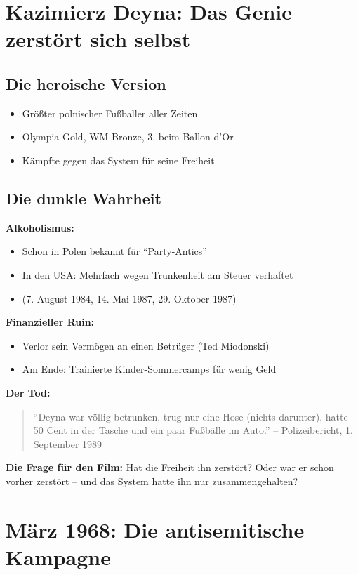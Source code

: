 \documentclass[11pt,a4paper]{book}
\begin{document}
\section{Kazimierz Deyna: Das Genie zerstört sich selbst}

\subsection{Die heroische Version}

\begin{itemize}
    \item Größter polnischer Fußballer aller Zeiten
    \item Olympia-Gold, WM-Bronze, 3. beim Ballon d'Or
    \item Kämpfte gegen das System für seine Freiheit
\end{itemize}

\subsection{Die dunkle Wahrheit}

\textbf{Alkoholismus:}
\begin{itemize}
    \item Schon in Polen bekannt für ``Party-Antics''
    \item In den USA: Mehrfach wegen Trunkenheit am Steuer verhaftet
    \item (7. August 1984, 14. Mai 1987, 29. Oktober 1987)
\end{itemize}

\textbf{Finanzieller Ruin:}
\begin{itemize}
    \item Verlor sein Vermögen an einen Betrüger (Ted Miodonski)
    \item Am Ende: Trainierte Kinder-Sommercamps für wenig Geld
\end{itemize}

\textbf{Der Tod:}
\begin{quote}
``Deyna war völlig betrunken, trug nur eine Hose (nichts darunter), hatte 50 Cent in der Tasche und ein paar Fußbälle im Auto.'' -- Polizeibericht, 1. September 1989
\end{quote}

\textbf{Die Frage für den Film:} Hat die Freiheit ihn zerstört? Oder war er schon vorher zerstört -- und das System hatte ihn nur zusammengehalten?

\section{März 1968: Die antisemitische Kampagne}
\end{document}
